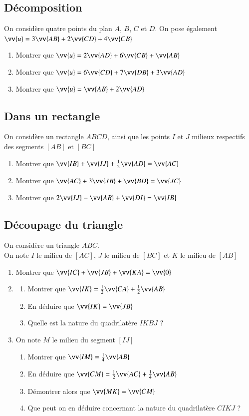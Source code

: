 \documentclass[oneside,12pt]{article}          %
\begin{document}
\subsection{Décomposition}
On considère quatre points du plan $A$, $B$, $C$ et $D$. On pose également $\vv{u}=3\vv{AB}+2\vv{CD}+4\vv{CB}$
\begin{enumerate}
	\item Montrer que $\vv{u}=2\vv{AD}+6\vv{CB}+\vv{AB}$
	\item Montrer que $\vv{u}=6\vv{CD}+7\vv{DB}+3\vv{AD}$
	\item Montrer que $\vv{u}=\vv{AB}+2\vv{AD}$
\end{enumerate}



\subsection{Dans un rectangle}
On considère un rectangle $ABCD$, ainsi que les points $I$ et $J$ milieux respectifs des segments $[AB]$ et $[BC]$
\begin{enumerate}
	\item Montrer que $\vv{IB}+\vv{IJ}+\frac{1}{2}\vv{AD}=\vv{AC}$
	\item Montrer que $\vv{AC}+3\vv{JB}+\vv{BD}=\vv{JC}$
	\item Montrer que $2\vv{IJ}-\vv{AB}+\vv{DI}=\vv{IB}$
\end{enumerate}


\subsection{Découpage du triangle}
On considère un triangle $ABC$. \\
On note $I$ le milieu de $[AC]$, $J$ le milieu de $[BC]$ et $K$ le milieu de $[AB]$ 
\begin{enumerate}
	\item Montrer que $\vv{IC}+\vv{JB}+\vv{KA}=\vv{0}$
	\item \begin{enumerate}
		\item Montrer que $\vv{IK}=\frac{1}{2}\vv{CA}+\frac{1}{2}\vv{AB}$
		\item En déduire que $\vv{IK}=\vv{JB}$
		\item Quelle est la nature du quadrilatère $IKBJ$ ?
	\end{enumerate}
	\item On note $M$ le milieu du segment $[IJ]$
	\begin{enumerate}
		\item Montrer que $\vv{IM}=\frac{1}{4}\vv{AB}$
		\item En déduire que $\vv{CM}=\frac{1}{2}\vv{AC}+\frac{1}{4}\vv{AB}$
		\item Démontrer alors que $\vv{MK}=\vv{CM}$
		\item Que peut on en déduire concernant la nature du quadrilatère $CIKJ$ ?
	\end{enumerate}
\end{enumerate}
\end{document}
